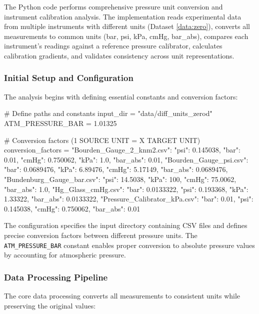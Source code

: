 \documentclass{article}
\begin{document}
The Python code performs comprehensive pressure unit conversion and instrument calibration analysis. The implementation reads experimental data from multiple instruments with different units (Dataset \ref{data:zero}), converts all measurements to common units (bar, psi, kPa, cmHg, bar\_abs), compares each instrument's readings against a reference pressure calibrator, calculates calibration gradients, and validates consistency across unit representations.

\subsubsection{Initial Setup and Configuration}
The analysis begins with defining essential constants and conversion factors:

\begin{python}
# Define paths and constants
input_dir = "data/diff_units_zerod"
ATM_PRESSURE_BAR = 1.01325

# Conversion factors (1 SOURCE UNIT = X TARGET UNIT)
conversion_factors = {
    "Bourden_Gauge_2_knm2.csv": {"psi": 0.145038, "bar": 0.01, "cmHg": 0.750062, "kPa": 1.0, "bar_abs": 0.01},
    "Bourden_Gauge_psi.csv": {"bar": 0.0689476, "kPa": 6.89476, "cmHg": 5.17149, "bar_abs": 0.0689476},
    "Bundenburg_Gauge_bar.csv": {"psi": 14.5038, "kPa": 100, "cmHg": 75.0062, "bar_abs": 1.0},
    "Hg_Glass_cmHg.csv": {"bar": 0.0133322, "psi": 0.193368, "kPa": 1.33322, "bar_abs": 0.0133322},
    "Pressure_Calibrator_kPa.csv": {"bar": 0.01, "psi": 0.145038, "cmHg": 0.750062, "bar_abs": 0.01}
}
\end{python}

The configuration specifies the input directory containing CSV files and defines precise conversion factors between different pressure units. The \texttt{ATM\_PRESSURE\_BAR} constant enables proper conversion to absolute pressure values by accounting for atmospheric pressure.

\subsubsection{Data Processing Pipeline}
The core data processing converts all measurements to consistent units while preserving the original values:
\end{document}
